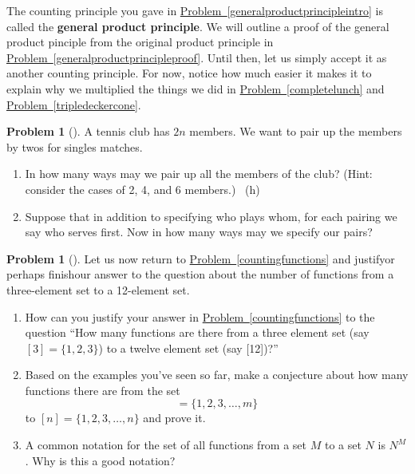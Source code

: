 \documentclass[10pt,]{book}
\newcommand{\terminology}[1]{\textbf{#1}}
\theoremstyle{plain}
\theoremstyle{definition}
\newtheorem{activity}[project]{Problem}
\theoremstyle{definition}
\numberwithin{equation}{chapter}
\newcommand{\importantarrow}{\Rightarrow}
\begin{document}
\hypertarget{p-85}{}%
The counting principle you gave in \hyperref[generalproductprincipleintro]{Problem~\ref{generalproductprincipleintro}} is called the \terminology{general product principle}. We will outline a proof of the general product pinciple from the original product principle in \hyperref[generalproductprincipleproof]{Problem~\ref{generalproductprincipleproof}}. Until then, let us simply accept it as another counting principle. For now, notice how much easier it makes it to explain why we multiplied the things we did in \hyperref[completelunch]{Problem~\ref{completelunch}} and \hyperref[tripledeckercone]{Problem~\ref{tripledeckercone}}.%
\begin{activity}[]\marginsymbol[-1em]{\pdftooltip{$\importantarrow$}{especially interesting}} \label{tennispairings1}
\hypertarget{p-86}{}%
A tennis club has \(2n\) members. We want to pair up the members by twos for singles matches.%
\begin{enumerate}[font=\bfseries,label=(\alph*),ref=\alph*]
\item\label{tennispairings1a} \marginsymbol[-2.5em]{} \hypertarget{p-87}{}%
In how many ways may we pair up all the members of the club? (Hint: consider the cases of 2, 4, and 6 members.)%
~{\tiny (h)}\item\label{task-14} \marginsymbol[-2.5em]{} \hypertarget{p-90}{}%
Suppose that in addition to specifying who plays whom, for each pairing we say who serves first.  Now in how many ways may we specify our pairs?%
\end{enumerate}
\end{activity}
\begin{activity}[] \label{countingfunctions2}
\hypertarget{p-91}{}%
Let us now return to \hyperref[countingfunctions]{Problem~\ref{countingfunctions}} and justify\textemdash{}or perhaps finish\textemdash{}our answer to the question about the number of functions from a three-element set to a 12-element set.%
\begin{enumerate}[font=\bfseries,label=(\alph*),ref=\alph*]
\item\label{task-15} \marginsymbol[-2.5em]{} \hypertarget{p-92}{}%
How can you justify your answer in \hyperref[countingfunctions]{Problem~\ref{countingfunctions}} to the question ``How many functions are there from a three element set (say \([3]=\{1,2,3\}\)) to a twelve element set (say [12])?''%
\item\label{numberoffunctionsconjecture} \marginsymbol[-2.5em]{} \hypertarget{p-94}{}%
Based on the examples you've seen so far, make a conjecture about how many functions there are from the set%
\begin{equation*}
[m] = \{1,2,3,\dots,m\}
\end{equation*}
to \([n]=\{1,2,3,\dots,n\}\) and prove it.%
\item\label{task-17} \marginsymbol[-2.5em]{} \hypertarget{p-96}{}%
A common notation for the set of all functions from a set \(M\) to a set \(N\) is \(N^M\).  Why is this a good notation?%
\end{enumerate}
\end{activity}
\end{document}
